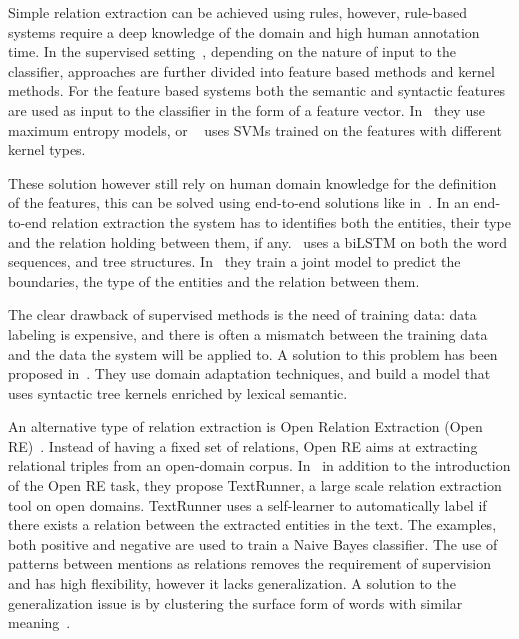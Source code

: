 Simple relation extraction can be achieved using rules, however, rule-based systems require a deep knowledge of the domain and high human annotation time. In the supervised setting~\citep{bach2007review}, depending on the nature of input to the classifier, approaches are further divided into feature based methods and kernel methods. For the feature based systems both the semantic and syntactic features are used as input to the classifier in the form of a feature vector. In~\citep{Kambhatla2004extraction} they use maximum entropy models, or ~\citep{zhao-grishman-2005-extracting, zhou-etal-2005-exploring} uses SVMs trained on the features with different kernel types.

These solution however still rely on human domain knowledge for the definition of the features, this can be solved using end-to-end solutions like in~\citep{miwa-bansal-2016-end, pawar-etal-2017-end}. In an end-to-end relation extraction the system has to identifies both the entities, their type and the relation holding between them, if any.~\cite{miwa-bansal-2016-end} uses a biLSTM on both the word sequences, and tree structures. In~\cite{pawar-etal-2017-end} they train a joint model to predict the boundaries, the type of the entities and the relation between them. 

The clear drawback of supervised methods is the need of training data: data labeling is expensive, and there is often a mismatch between the training data and the data the system will be applied to. A solution to this problem has been proposed in~\citep{plank-moschitti-2013-embedding}. They use domain adaptation techniques, and build a model that uses syntactic tree kernels enriched by lexical semantic.

An alternative type of relation extraction is Open Relation Extraction (Open RE)~\citep{banko2007openre, banko-etzioni-2008-tradeoffs}. Instead of having a fixed set of relations, Open RE aims at extracting relational triples from an open-domain corpus.  In~\citep{banko2007openre} in addition to the introduction of the Open RE task, they propose TextRunner, a large scale relation extraction tool on open domains. TextRunner uses a self-learner to automatically label if there exists a relation between the extracted entities in the text. The examples, both positive and negative are used to train a Naive Bayes classifier. The use of patterns between mentions as relations removes the requirement of supervision and has high flexibility, however it lacks generalization. A solution to the generalization issue is by clustering the surface form of words with similar meaning~\citep{yao-etal-2011-structured}.

